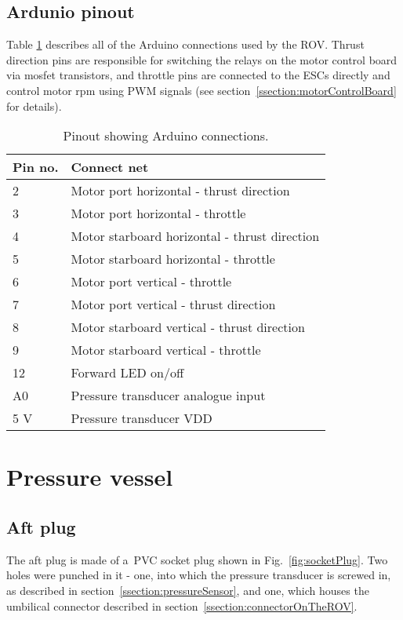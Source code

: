 \subsection{Ardunio pinout}\label{ssection:arduinoPinout}

Table \ref{tab:pinoutMain} describes all of the Arduino connections used by the ROV. Thrust direction pins are responsible for switching the relays on the motor control board via mosfet transistors, and throttle pins are connected to the ESCs directly and control motor rpm using PWM signals (see section~\ref{ssection:motorControlBoard} for details).

\begin{table}[h]
\centering
\caption{Pinout showing Arduino connections.}
\label{tab:pinoutMain}
\begin{tabular}{@{}ll@{}}
\toprule
\textbf{Pin  no.} & \textbf{Connect net} \\ \midrule
2 & Motor port horizontal - thrust direction \\
3 & Motor port horizontal - throttle \\
4 & Motor starboard horizontal - thrust direction \\
5 & Motor starboard horizontal - throttle \\
6 & Motor port vertical - throttle \\
7 & Motor port vertical - thrust direction \\
8 & Motor starboard vertical - thrust direction \\
9 & Motor starboard vertical - throttle \\
12 & Forward LED on/off \\
A0 & Pressure transducer analogue input \\
5 V & Pressure transducer VDD \\
\bottomrule
\end{tabular}
\end{table}

\section{Pressure vessel}\label{section:pressureVessel}

\subsection{Aft plug}\label{sscetion:aftPlug}
The aft plug is made of a~PVC socket plug shown in Fig.~\ref{fig:socketPlug}. Two holes were punched in it - one, into which the pressure transducer is screwed in, as described in section~\ref{ssection:pressureSensor}, and one, which houses the umbilical connector described in section~\ref{ssection:connectorOnTheROV}.

